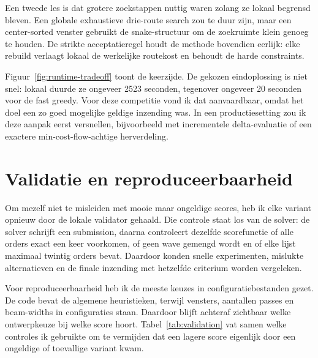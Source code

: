 \documentclass[a4paper,11pt]{article}
\begin{document}
Een tweede les is dat grotere zoekstappen nuttig waren zolang ze lokaal begrensd bleven. Een globale exhaustieve drie-route search zou te duur zijn, maar een center-sorted venster gebruikt de snake-structuur om de zoekruimte klein genoeg te houden. De strikte acceptatieregel houdt de methode bovendien eerlijk: elke rebuild verlaagt lokaal de werkelijke routekost en behoudt de harde constraints.

Figuur~\ref{fig:runtime-tradeoff} toont de keerzijde. De gekozen eindoplossing is niet snel: lokaal duurde ze ongeveer 2523 seconden, tegenover ongeveer 20 seconden voor de fast greedy. Voor deze competitie vond ik dat aanvaardbaar, omdat het doel een zo goed mogelijke geldige inzending was. In een productiesetting zou ik deze aanpak eerst versnellen, bijvoorbeeld met incrementele delta-evaluatie of een exactere min-cost-flow-achtige herverdeling.

\section{Validatie en reproduceerbaarheid}
Om mezelf niet te misleiden met mooie maar ongeldige scores, heb ik elke variant opnieuw door de lokale validator gehaald. Die controle staat los van de solver: de solver schrijft een submission, daarna controleert dezelfde scorefunctie of alle orders exact een keer voorkomen, of geen wave gemengd wordt en of elke lijst maximaal twintig orders bevat. Daardoor konden snelle experimenten, mislukte alternatieven en de finale inzending met hetzelfde criterium worden vergeleken.

Voor reproduceerbaarheid heb ik de meeste keuzes in configuratiebestanden gezet. De code bevat de algemene heuristieken, terwijl vensters, aantallen passes en beam-widths in configuraties staan. Daardoor blijft achteraf zichtbaar welke ontwerpkeuze bij welke score hoort. Tabel~\ref{tab:validation} vat samen welke controles ik gebruikte om te vermijden dat een lagere score eigenlijk door een ongeldige of toevallige variant kwam.
\end{document}

